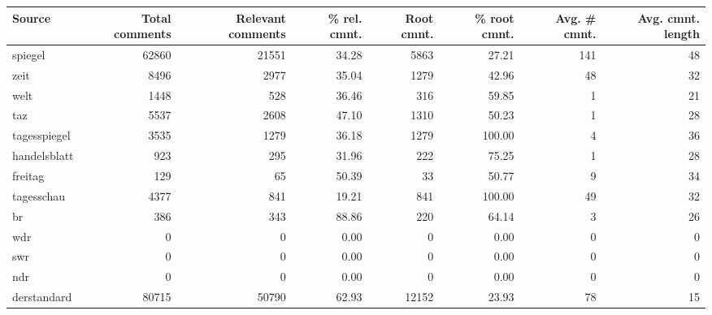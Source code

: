 \begin{table}	
	\begin{tabular}{lrrrrrrr}
		\toprule
		Source             & Total comments & Relevant comments & \% rel. cmnt. & Root cmnt. & \% root cmnt. & Avg. \# cmnt. & Avg. cmnt. length\footnotemark[1] \\ \midrule
		spiegel            &          62860 &             21551 &         34.28 &       5863 &         27.21 &           141 &                48 \\
		zeit               &           8496 &              2977 &         35.04 &       1279 &         42.96 &            48 &                32 \\
		welt               &           1448 &               528 &         36.46 &        316 &         59.85 &             1 &                21 \\
		taz                &           5537 &              2608 &         47.10 &       1310 &         50.23 &             1 &                28 \\
		tagesspiegel       &           3535 &              1279 &         36.18 &       1279 &        100.00 &             4 &                36 \\
		handelsblatt       &            923 &               295 &         31.96 &        222 &         75.25 &             1 &                28 \\
		freitag            &            129 &                65 &         50.39 &         33 &         50.77 &             9 &                34 \\
		tagesschau         &           4377 &               841 &         19.21 &        841 &        100.00 &            49 &                32 \\
		br                 &            386 &               343 &         88.86 &        220 &         64.14 &             3 &                26 \\
		wdr                &              0 &                 0 &          0.00 &          0 &          0.00 &             0 &                 0 \\
		swr                &              0 &                 0 &          0.00 &          0 &          0.00 &             0 &                 0 \\
		ndr                &              0 &                 0 &          0.00 &          0 &          0.00 &             0 &                 0 \\
		derstandard        &          80715 &             50790 &         62.93 &      12152 &         23.93 &            78 &                15 \\

\end{tabular}
\end{table}

